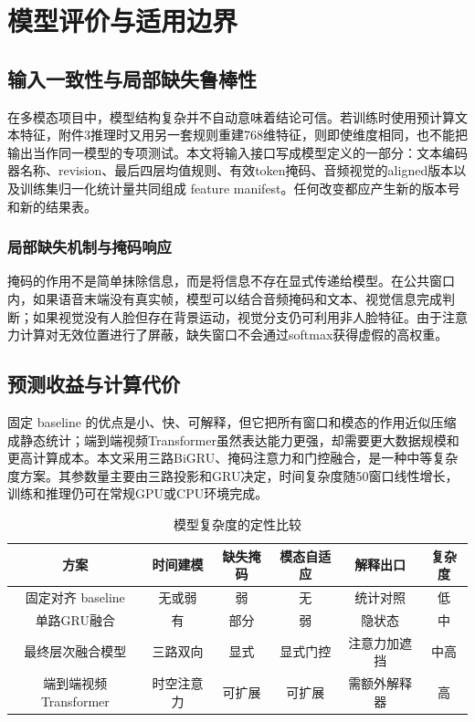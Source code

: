 \documentclass{gmcmthesis}
\begin{document}
\clearpage
\section{模型评价与适用边界}
\subsection{输入一致性与局部缺失鲁棒性}
在多模态项目中，模型结构复杂并不自动意味着结论可信。若训练时使用预计算文本特征，附件3推理时又用另一套规则重建768维特征，则即使维度相同，也不能把输出当作同一模型的专项测试。本文将输入接口写成模型定义的一部分：文本编码器名称、revision、最后四层均值规则、有效token掩码、音频视觉的aligned版本以及训练集归一化统计量共同组成 feature manifest。任何改变都应产生新的版本号和新的结果表。
\subsubsection{局部缺失机制与掩码响应}
掩码的作用不是简单抹除信息，而是将信息不存在显式传递给模型。在公共窗口内，如果语音末端没有真实帧，模型可以结合音频掩码和文本、视觉信息完成判断；如果视觉没有人脸但存在背景运动，视觉分支仍可利用非人脸特征。由于注意力计算对无效位置进行了屏蔽，缺失窗口不会通过softmax获得虚假的高权重。
\subsection{预测收益与计算代价}
固定 baseline 的优点是小、快、可解释，但它把所有窗口和模态的作用近似压缩成静态统计；端到端视频Transformer虽然表达能力更强，却需要更大数据规模和更高计算成本。本文采用三路BiGRU、掩码注意力和门控融合，是一种中等复杂度方案。其参数量主要由三路投影和GRU决定，时间复杂度随50窗口线性增长，训练和推理仍可在常规GPU或CPU环境完成。

\begin{table}[H]
\centering
\small
\caption{模型复杂度的定性比较}
\label{tab:complexity}
\begin{tabular}{cccccc}
\toprule
方案 & 时间建模 & 缺失掩码 & 模态自适应 & 解释出口 & 复杂度 \\
\midrule
固定对齐 baseline & 无或弱 & 弱 & 无 & 统计对照 & 低 \\
单路GRU融合 & 有 & 部分 & 弱 & 隐状态 & 中 \\
最终层次融合模型 & 三路双向 & 显式 & 显式门控 & 注意力加遮挡 & 中高 \\
端到端视频Transformer & 时空注意力 & 可扩展 & 可扩展 & 需额外解释器 & 高 \\
\bottomrule
\end{tabular}
\end{table}
\end{document}
